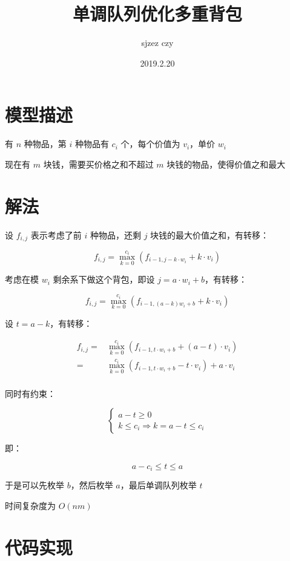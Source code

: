 \documentclass[UTF8]{article}
\author {sjzez czy}
\title {单调队列优化多重背包}
\date{2019.2.20}
\begin{document}
\maketitle

\tableofcontents

\newpage

\section{模型描述}

有 $n$ 种物品，第 $i$ 种物品有 $c_i$ 个，每个价值为 $v_i$，单价 $w_i$

现在有 $m$ 块钱，需要买价格之和不超过 $m$ 块钱的物品，使得价值之和最大

\section{解法}

设 $f_{i,j}$ 表示考虑了前 $i$ 种物品，还剩 $j$ 块钱的最大价值之和，有转移：

$$
f_{i,j}=\max_{k=0}^{c_i} \left(f_{i-1,j-k \cdot w_i}+ k \cdot v_i \right)
$$

考虑在模 $w_i$ 剩余系下做这个背包，即设 $j=a \cdot w_i+b$，有转移：

$$
f_{i,j}=\max_{k=0}^{c_i} \left( f_{i-1,(a-k)w_i+b} + k \cdot v_i \right)
$$

设 $t=a-k​$，有转移：

$$
\begin{aligned}
f_{i,j}
= & \max_{k=0}^{c_i} \left( f_{i-1,t \cdot w_i+b} + (a-t) \cdot v_i \right) \\
= & \max_{k=0}^{c_i} \left( f_{i-1,t \cdot w_i+b} - t \cdot v_i \right) + a \cdot v_i\\
\end{aligned}
$$

同时有约束：

$$
\begin{cases}
a-t \ge 0 \\
k \le c_i \Rightarrow k=a-t \le c_i
\end{cases}
$$

即：

$$
a-c_i \le t \le a
$$

于是可以先枚举 $b$，然后枚举 $a$，最后单调队列枚举 $t$

时间复杂度为 $O(nm)$

\section{代码实现}
\end{document}
